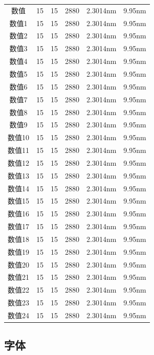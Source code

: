 \documentclass[AutoFakeBold]{LZUThesis}
\begin{document}
\begin{longtable}{cccccc}
    数值   & 15 & 15 & 2880 & 2.3014nm & 9.95nm     \\
    数值1  & 15 & 15 & 2880 & 2.3014nm & 9.95nm     \\
    数值2  & 15 & 15 & 2880 & 2.3014nm & 9.95nm     \\
    数值3  & 15 & 15 & 2880 & 2.3014nm & 9.95nm     \\
    数值4  & 15 & 15 & 2880 & 2.3014nm & 9.95nm     \\
    数值5  & 15 & 15 & 2880 & 2.3014nm & 9.95nm     \\
    数值6  & 15 & 15 & 2880 & 2.3014nm & 9.95nm     \\
    数值7  & 15 & 15 & 2880 & 2.3014nm & 9.95nm     \\
    数值8  & 15 & 15 & 2880 & 2.3014nm & 9.95nm     \\
    数值9  & 15 & 15 & 2880 & 2.3014nm & 9.95nm     \\
    数值10 & 15 & 15 & 2880 & 2.3014nm & 9.95nm     \\
    数值11 & 15 & 15 & 2880 & 2.3014nm & 9.95nm     \\
    数值12 & 15 & 15 & 2880 & 2.3014nm & 9.95nm     \\
    数值13 & 15 & 15 & 2880 & 2.3014nm & 9.95nm     \\
    数值14 & 15 & 15 & 2880 & 2.3014nm & 9.95nm     \\
    数值15 & 15 & 15 & 2880 & 2.3014nm & 9.95nm     \\
    数值16 & 15 & 15 & 2880 & 2.3014nm & 9.95nm     \\
    数值17 & 15 & 15 & 2880 & 2.3014nm & 9.95nm     \\
    数值18 & 15 & 15 & 2880 & 2.3014nm & 9.95nm     \\
    数值19 & 15 & 15 & 2880 & 2.3014nm & 9.95nm     \\
    数值20 & 15 & 15 & 2880 & 2.3014nm & 9.95nm     \\
    数值21 & 15 & 15 & 2880 & 2.3014nm & 9.95nm     \\
    数值22 & 15 & 15 & 2880 & 2.3014nm & 9.95nm     \\
    数值23 & 15 & 15 & 2880 & 2.3014nm & 9.95nm     \\
    数值24 & 15 & 15 & 2880 & 2.3014nm & 9.95nm     \\
\end{longtable}





\subsection{字体} %
\label{sub:字体}
\end{document}
